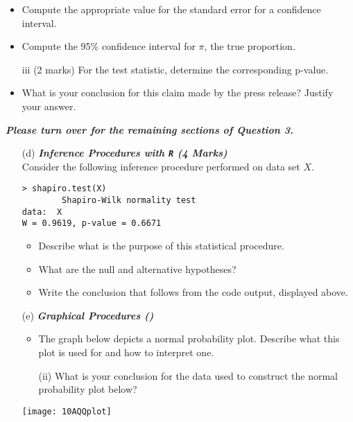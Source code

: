 \begin{itemize}
\begin{itemize}

\item  Compute the appropriate value for the standard error for a confidence interval.

\item  Compute the 95\% confidence interval for $\pi$, the true proportion.
%
\item[iii] (2 marks) For the test statistic, determine the corresponding p-value.

\item  What is your conclusion for this claim made by the press release? Justify your answer.
\end{itemize}
\end{itemize}
{
\normalsize
\textit{\textbf{Please turn over for the remaining sections of Question 3.}}
}
%
\newpage
\begin{itemize}

\item[(d)] \textbf{\textit{ Inference Procedures with \texttt{R} (4 Marks)}}\\
Consider the following inference procedure performed on data set $X$.
\begin{center}
\begin{framed}
\begin{verbatim}
> shapiro.test(X)
        Shapiro-Wilk normality test
data:  X
W = 0.9619, p-value = 0.6671
\end{verbatim}
\end{framed}
\end{center}

\begin{itemize}

\item  Describe what is the purpose of this statistical procedure.

\item  What are the null and alternative hypotheses?

\item  Write the conclusion that follows from the code output, displayed above.
\end{itemize}
\end{itemize}

\begin{itemize}

\item[(e)] \textbf{\textit{Graphical Procedures ()}}
\begin{itemize}

\item  The graph below depicts a normal probability plot. Describe what this plot is used for and how to interpret one.

\item[(ii)] What is your conclusion for the data used to construct the normal probability plot below?
\end{itemize}
\begin{center}
\texttt{[image: 10AQQplot]}
\end{center}
\end{itemize}
%

